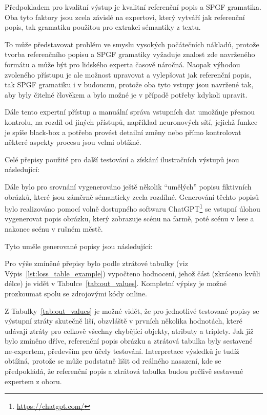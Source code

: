 Předpokladem pro kvalitní výstup je kvalitní referenční popis a SPGF gramatika.
Oba tyto faktory jsou zcela závislé na expertovi, který vytváří jak referenční popis, tak gramatiku použitou pro extrakci sémantiky z textu.

To může představovat problém ve smyslu vysokých počátečních nákladů, protože tvorba referenčního popisu a SPGF gramatiky
vyžaduje znalost zde navrženého formátu a může být pro lidského experta časově náročná.
Naopak výhodou zvoleného přístupu je ale možnost upravovat a vylepšovat jak referenční popis, tak SPGF gramatiku i v budoucnu,
protože oba tyto vstupy jsou navržené tak, aby byly čitelné člověkem a bylo možné je v případě potřeby kdykoli upravit.

Dále tento expertní přístup a manuální správa vstupních dat umožňuje přesnou kontrolu, na rozdíl od jiných přístupů, například neuronových sítí, jejichž funkce je spíše black-box a
potřeba provést detailní změny nebo přímo kontrolovat některé aspekty procesu jsou velmi obtížné.

Celé přepisy použité pro další testování a získání ilustračních výstupů jsou následující:


Dále bylo pro srovnání vygenerováno ještě několik \enquote{umělých} popisu fiktivních obrázků,
které jsou záměrně sémanticky zcela rozdílné.
Generování těchto popisů bylo realizováno pomocí volně dostupného softwaru ChatGPT\footnote{\href{https://chatgpt.com/}{https://chatgpt.com/}} se vstupní úlohou
vygenerovat popis obrázku, který zobrazuje scénu na farmě, poté scénu v lese a nakonec scénu v rušném městě.

\newpage
Tyto uměle generované popisy jsou následující:


Pro výše zmíněné přepisy bylo podle ztrátové tabulky (viz Výpis~\ref{lst:loss_table_example}) vypočteno hodnocení,
jehož část (zkráceno kvůli délce) je vidět v Tabulce~\ref{tab:out_values}.
Kompletní výpisy je možné prozkoumat spolu se zdrojovými kódy online.

Z Tabulky~\ref{tab:out_values} je možné vidět, že pro jednotlivé testované popisy se výstupní ztráty skutečně liší, obzvláště v prvních několika
hodnotách, které udávají ztráty pro celkově všechny chybějící objekty, atributy a triplety.
Jak již bylo zmíněno dříve, referenční popis obrázku a ztrátová tabulka byly sestavené ne-expertem, především pro účely testování.
Interpretace výsledků je tudíž obtížná, protože se může podstatně lišit od reálného nasazení, kde se předpokládá, že referenční popis a
ztrátová tabulka budou pečlivě sestavené expertem z oboru.

